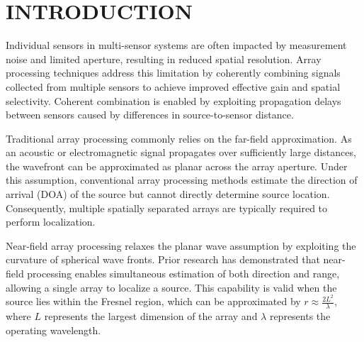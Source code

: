 %
%
%
%

\chapter{INTRODUCTION}
\thispagestyle{empty}


Individual sensors in multi-sensor systems are often impacted by measurement noise and limited aperture, resulting in reduced spatial resolution. Array processing techniques address this limitation by coherently combining signals collected from multiple sensors to achieve improved effective gain and spatial selectivity. Coherent combination is enabled by exploiting propagation delays between sensors caused by differences in source-to-sensor distance.

Traditional array processing commonly relies on the far-field approximation. As an acoustic or electromagnetic signal propagates over sufficiently large distances, the wavefront can be approximated as planar across the array aperture. Under this assumption, conventional array processing methods estimate the direction of arrival (DOA) of the source but cannot directly determine source location. Consequently, multiple spatially separated arrays are typically required to perform localization.

Near-field array processing relaxes the planar wave assumption by exploiting the curvature of spherical wave fronts. Prior research has demonstrated that near-field processing enables simultaneous estimation of both direction and range, allowing a single array to localize a source\cite{Single_Array}. This capability is valid when the source lies within the Fresnel region, which can be approximated by $r \approx \frac{2L^2}{\lambda}$, where $L$ represents the largest dimension of the array and $\lambda$ represents the operating wavelength\cite{array_freq_invariance}\cite{Adaptive_Beamforming}.

